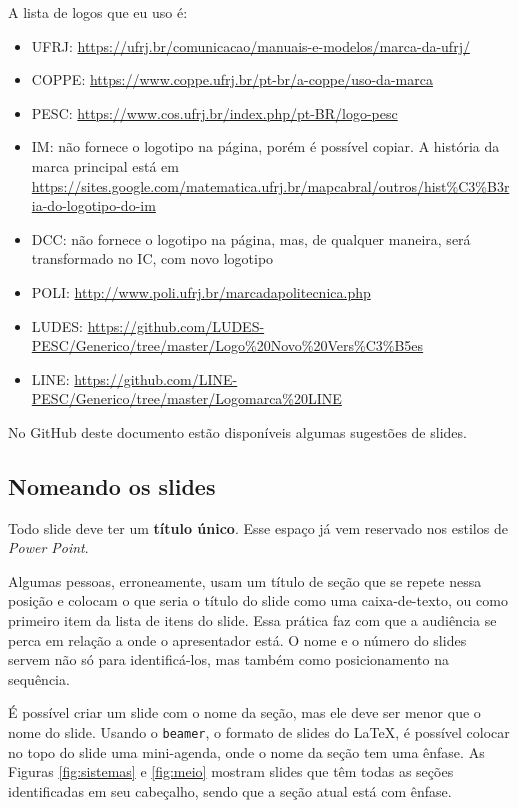 A lista de logos que eu uso é:
\begin{itemize}
    \item UFRJ: \url{https://ufrj.br/comunicacao/manuais-e-modelos/marca-da-ufrj/}
    \item COPPE: \url{https://www.coppe.ufrj.br/pt-br/a-coppe/uso-da-marca}
    \item PESC:  \url{https://www.cos.ufrj.br/index.php/pt-BR/logo-pesc}
    \item IM: não fornece o logotipo na página, porém é possível copiar. A história da marca principal está em \url{https://sites.google.com/matematica.ufrj.br/mapcabral/outros/hist%C3%B3ria-do-logotipo-do-im}
    \item DCC: não fornece o logotipo na página, mas, de qualquer maneira, será transformado no IC, com novo logotipo
    \item POLI: \url{http://www.poli.ufrj.br/marcadapolitecnica.php}
    \item LUDES: \url{https://github.com/LUDES-PESC/Generico/tree/master/Logo%20Novo%20Vers%C3%B5es}
    \item LINE: \url{https://github.com/LINE-PESC/Generico/tree/master/Logomarca%20LINE}
\end{itemize}

No GitHub deste documento estão disponíveis algumas sugestões de slides.


\subsection{Nomeando os slides}

Todo slide deve ter um \textbf{título único}. Esse espaço já vem reservado nos estilos de \textit{Power Point}.

Algumas pessoas, erroneamente, usam um título de seção que se repete nessa posição e colocam o que seria o título do slide como uma caixa-de-texto, ou como primeiro item da lista de itens do slide. Essa prática faz com que a audiência se perca em relação a onde o apresentador está. O nome e o número do slides servem não só para identificá-los, mas também como posicionamento na sequência.

É possível criar um slide com o nome da seção, mas ele deve ser menor que o nome do slide. Usando o \texttt{beamer}, o formato de slides do \LaTeX, é possível colocar no topo do slide uma mini-agenda, onde o nome da seção tem uma ênfase. As Figuras \ref{fig:sistemas} e \ref{fig:meio} mostram  slides que têm todas as seções identificadas em seu cabeçalho, sendo que a seção atual está com ênfase.

